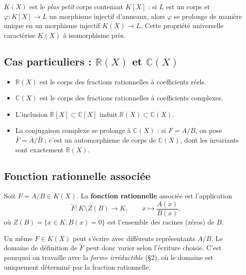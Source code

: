 \begin{remarque}
$K(X)$ est le \emph{plus petit} corps contenant $K[X]$ : si $L$ est un corps et $\varphi : K[X] \to L$ un morphisme injectif d'anneaux, alors $\varphi$ se prolonge de manière unique en un morphisme injectif $K(X) \to L$. Cette propriété universelle caractérise $K(X)$ à isomorphisme près.
\end{remarque}

\subsection{Cas particuliers : $\mathbb{R}(X)$ et $\mathbb{C}(X)$}

\begin{itemize}
    \item $\mathbb{R}(X)$ est le corps des fractions rationnelles à coefficients réels.
    \item $\mathbb{C}(X)$ est le corps des fractions rationnelles à coefficients complexes.
    \item L'inclusion $\mathbb{R}[X] \subset \mathbb{C}[X]$ induit $\mathbb{R}(X) \subset \mathbb{C}(X)$.
    \item La conjugaison complexe se prolonge à $\mathbb{C}(X)$ : si $F = A/B$, on pose $\bar{F} = \bar{A}/\bar{B}$ ; c'est un automorphisme de corps de $\mathbb{C}(X)$, dont les invariants sont exactement $\mathbb{R}(X)$.
\end{itemize}

\subsection{Fonction rationnelle associée}

\begin{definition}
Soit $F = A/B \in K(X)$. La \textbf{fonction rationnelle} associée est l'application
\[ \widetilde{F} : K \setminus Z(B) \longrightarrow K, \qquad x \longmapsto \frac{A(x)}{B(x)}, \]
où $Z(B) = \{x \in K : B(x) = 0\}$ est l'ensemble des racines (zéros) de $B$.
\end{definition}

\begin{remarque}
Un même $F \in K(X)$ peut s'écrire avec différents représentants $A/B$. Le domaine de définition de $\widetilde{F}$ peut donc varier selon l'écriture choisie. C'est pourquoi on travaille avec la \emph{forme irréductible} (§2), où le domaine est uniquement déterminé par la fraction rationnelle.
\end{remarque}

